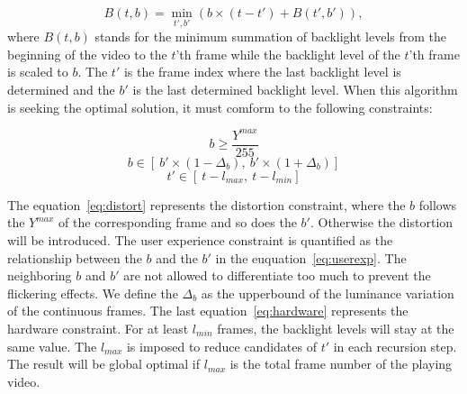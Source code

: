 \begin{equation}
  \label{eq:dp}
B(t,b) = \min_{t',b'}(b \times (t - t') + B(t', b')),
\end{equation}
where $B(t, b)$ stands for the minimum summation of backlight levels
from the beginning of the video to the $t$'th frame while the
backlight level of the $t$'th frame is scaled to $b$. The $t'$ is the
frame index where the last backlight level is determined and the $b'$
is the last determined backlight level. When this algorithm is seeking
the optimal solution, it must comform to the following constraints:


\begin{equation}
  \label{eq:distort}
  b \ge \frac{Y^{max}}{255}
\end{equation}
\begin{equation}
  \label{eq:userexp}
  b \in [\ b' \times ( 1 - \Delta_b ),\ b' \times ( 1 +
    \Delta_b)]
\end{equation}
\begin{equation}
  \label{eq:hardware}
  t' \in [\ t - l_{max},\ t - l_{min}] 
\end{equation}


The equation~\ref{eq:distort} represents the distortion constraint,
where the $b$ follows the $Y^{max}$ of the corresponding frame and
so does the $b'$. Otherwise the distortion will be introduced. The
user experience constraint is quantified as the relationship between
the $b$ and the $b'$ in the euquation~\ref{eq:userexp}. The neighboring
$b$ and $b'$ are not allowed to differentiate too much to prevent the
flickering effects. We define the $\Delta_b$ as the upperbound of the
luminance variation of the continuous frames. The last equation~\ref{eq:hardware}
represents the hardware constraint. For at least $l_{min}$ frames, the
backlight levels will stay at the same value. The $l_{max}$ is imposed
to reduce candidates of $t'$ in each recursion step. The result will
be  global optimal if $l_{max}$ is the total frame number of the
playing video. 

